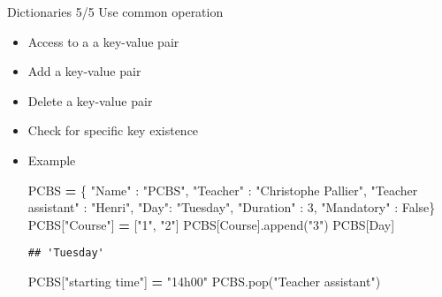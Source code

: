 \documentclass[
  8pt,
  ignorenonframetext,
]{beamer}
\newenvironment{Shaded}{\begin{snugshade}}{\end{snugshade}}
\newcommand{\DecValTok}[1]{\textcolor[rgb]{0.00,0.00,0.81}{#1}}
\newcommand{\NormalTok}[1]{#1}
\newcommand{\OperatorTok}[1]{\textcolor[rgb]{0.81,0.36,0.00}{\textbf{#1}}}
\newcommand{\StringTok}[1]{\textcolor[rgb]{0.31,0.60,0.02}{#1}}
\newcommand{\VariableTok}[1]{\textcolor[rgb]{0.00,0.00,0.00}{#1}}
\providecommand{\tightlist}{%
  \setlength{\itemsep}{0pt}\setlength{\parskip}{0pt}}
\begin{document}
\begin{frame}[fragile]{Dictionaries 5/5 Use common operation}
\protect\hypertarget{dictionaries-55-use-common-operation}{}
\begin{itemize}[<+->]
\tightlist
\item
  Access to a a key-value pair
\end{itemize}

\begin{itemize}[<+->]
\tightlist
\item
  Add a key-value pair
\end{itemize}

\begin{itemize}[<+->]
\tightlist
\item
  Delete a key-value pair
\end{itemize}

\begin{itemize}[<+->]
\tightlist
\item
  Check for specific key existence
\end{itemize}

\begin{itemize}[<+->]
\item
  Example

\begin{Shaded}
\begin{Highlighting}[]
\NormalTok{PCBS }\OperatorTok{=}\NormalTok{ \{  }\StringTok{"Name"}\NormalTok{ : }\StringTok{"PCBS"}\NormalTok{, }\StringTok{"Teacher"}\NormalTok{ : }\StringTok{"Christophe Pallier"}\NormalTok{,}
\StringTok{"Teacher assistant"}\NormalTok{ : }\StringTok{"Henri"}\NormalTok{, }
\StringTok{"Day"}\NormalTok{: }\StringTok{"Tuesday"}\NormalTok{, }\StringTok{"Duration"}\NormalTok{ : }\DecValTok{3}\NormalTok{, }\StringTok{"Mandatory"}\NormalTok{ : }\VariableTok{False}\NormalTok{\}}
\NormalTok{PCBS[}\StringTok{"Course"}\NormalTok{] }\OperatorTok{=}\NormalTok{ [}\StringTok{"1"}\NormalTok{, }\StringTok{"2"}\NormalTok{]}
\NormalTok{PCBS[}\StringTok{\textquotesingle{}Course\textquotesingle{}}\NormalTok{].append(}\StringTok{"3"}\NormalTok{)}
\NormalTok{PCBS[}\StringTok{\textquotesingle{}Day\textquotesingle{}}\NormalTok{]}
\end{Highlighting}
\end{Shaded}

\begin{verbatim}
## 'Tuesday'
\end{verbatim}

\begin{Shaded}
\begin{Highlighting}[]
\NormalTok{PCBS[}\StringTok{"starting time"}\NormalTok{] }\OperatorTok{=} \StringTok{"14h00"}
\NormalTok{PCBS.pop(}\StringTok{"Teacher assistant"}\NormalTok{)}
\end{Highlighting}
\end{Shaded}


\end{itemize}
\end{frame}
\end{document}
